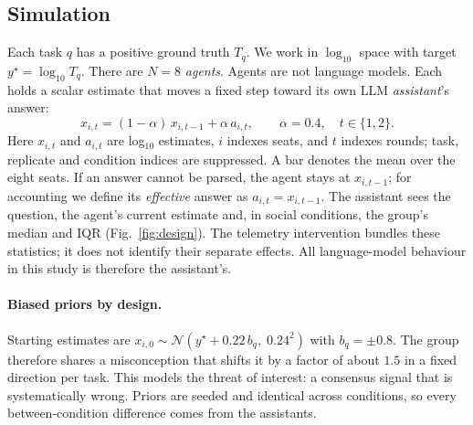 \documentclass[10pt]{article}
\theoremstyle{manuscript}\newtheorem{proposition}{Proposition}
\begin{document}
\subsection{Simulation}
Each task $q$ has a positive ground truth $T_q$. We work in $\log_{10}$ space with target $y^\star=\log_{10}T_q$. There are $N=8$ \emph{agents}. Agents are not language models. Each holds a scalar estimate that moves a fixed step toward its own LLM \emph{assistant}'s answer:
\begin{equation}\label{eq:update}
x_{i,t}=(1-\alpha)\,x_{i,t-1}+\alpha\,a_{i,t},\qquad \alpha=0.4,\quad t\in\{1,2\}.
\end{equation}
Here $x_{i,t}$ and $a_{i,t}$ are log$_{10}$ estimates, $i$ indexes seats, and $t$ indexes rounds; task, replicate and condition indices are suppressed. A bar denotes the mean over the eight seats. If an answer cannot be parsed, the agent stays at $x_{i,t-1}$; for accounting we define its \emph{effective} answer as $a_{i,t}=x_{i,t-1}$. The assistant sees the question, the agent's current estimate and, in social conditions, the group's median and IQR (Fig.~\ref{fig:design}). The telemetry intervention bundles these statistics; it does not identify their separate effects. All language-model behaviour in this study is therefore the assistant's.

\paragraph{Biased priors by design.} Starting estimates are $x_{i,0}\sim\mathcal N(y^\star+0.22\,b_q,\;0.24^2)$ with $b_q=\pm0.8$. The group therefore shares a misconception that shifts it by a factor of about $1.5$ in a fixed direction per task. This models the threat of interest: a consensus signal that is systematically wrong. Priors are seeded and identical across conditions, so every between-condition difference comes from the assistants.
\end{document}
